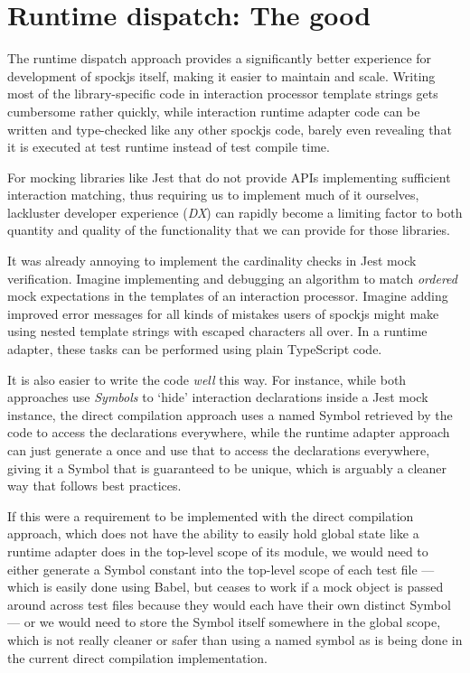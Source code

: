 \section{Runtime dispatch: The good}
The runtime dispatch approach
provides a significantly better experience
for development of spockjs itself,
making it easier to maintain and scale.
Writing most of the library-specific code
in interaction processor template strings
gets cumbersome rather quickly,
while interaction runtime adapter code
can be written and type-checked
like any other spockjs code,
barely even revealing that
it is executed at test runtime
instead of test compile time.

For mocking libraries like Jest
that do not provide APIs
implementing sufficient interaction matching,
thus requiring us to implement much of it ourselves,
lackluster developer experience (\textit{DX})
can rapidly become a limiting factor to both quantity and quality
of the functionality that we can provide for those libraries.

It was already annoying to implement
the cardinality checks in Jest mock verification.
Imagine implementing and debugging an algorithm
to match \textit{ordered} mock expectations
in the templates of an interaction processor.
Imagine adding improved error messages for
all kinds of mistakes users of spockjs might make
using nested template strings
with escaped characters all over.
In a runtime adapter,
these tasks can be performed
using plain TypeScript code.

It is also easier to write the code \textit{well} this way.
For instance, while both approaches use \textit{Symbols} \autocite{MdnSymbol}
to `hide' interaction declarations inside a Jest mock instance,
the direct compilation approach uses
a named Symbol retrieved by the code
to access the declarations everywhere,
while the runtime adapter approach can just
generate a  once and use that
to access the declarations everywhere,
giving it a Symbol that is guaranteed to be unique,
which is arguably a cleaner way that follows best practices.

If this were a requirement to be implemented with the direct compilation approach,
which does not have the ability to easily hold global state
like a runtime adapter does in the top-level scope of its module,
we would need to either generate a Symbol constant
into the top-level scope of each test file
--- which is easily done using Babel,
but ceases to work if a mock object is passed around across test files
because they would each have their own distinct Symbol ---
or we would need to store the Symbol itself
somewhere in the global scope,
which is not really cleaner or safer than using a named symbol
as is being done in the current direct compilation implementation.

